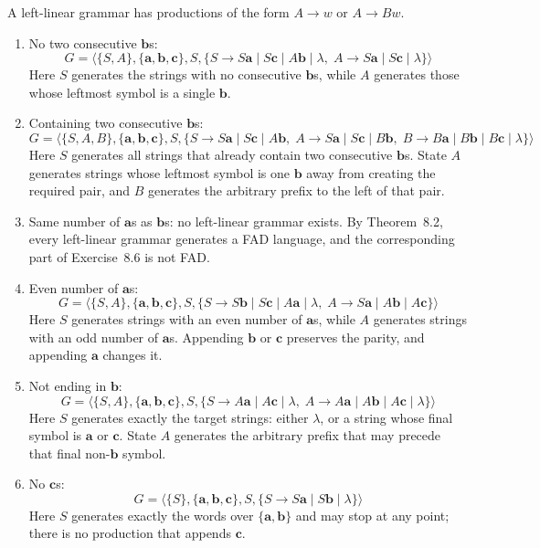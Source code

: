 \begin{enumerate}[{8.}1. ]
A left-linear grammar has productions of the form $A \to w$ or $A \to Bw$.

\begin{enumerate}
\item No two consecutive $\pmb{b}$s:
\[
G = \langle\{S,A\},\{\pmb{a},\pmb{b},\pmb{c}\},S,
\{S\to S\pmb{a}\mid S\pmb{c}\mid A\pmb{b}\mid \lambda,\;
  A\to S\pmb{a}\mid S\pmb{c}\mid \lambda\}\rangle
\]
Here $S$ generates the strings with no consecutive $\pmb{b}$s, while $A$
generates those whose leftmost symbol is a single $\pmb{b}$.

\item Containing two consecutive $\pmb{b}$s:
\[
G = \langle\{S,A,B\},\{\pmb{a},\pmb{b},\pmb{c}\},S,
\{S\to S\pmb{a}\mid S\pmb{c}\mid A\pmb{b},\;
  A\to S\pmb{a}\mid S\pmb{c}\mid B\pmb{b},\;
  B\to B\pmb{a}\mid B\pmb{b}\mid B\pmb{c}\mid \lambda\}\rangle
\]
Here $S$ generates all strings that already contain two consecutive $\pmb{b}$s.
State $A$ generates strings whose leftmost symbol is one $\pmb{b}$ away from
creating the required pair, and $B$ generates the arbitrary prefix to the left of
that pair.

\item Same number of $\pmb{a}$s as $\pmb{b}$s: no left-linear grammar exists.
By Theorem~8.2, every left-linear grammar generates a FAD language, and the
corresponding part of Exercise~8.6 is not FAD.

\item Even number of $\pmb{a}$s:
\[
G = \langle\{S,A\},\{\pmb{a},\pmb{b},\pmb{c}\},S,
\{S\to S\pmb{b}\mid S\pmb{c}\mid A\pmb{a}\mid \lambda,\;
  A\to S\pmb{a}\mid A\pmb{b}\mid A\pmb{c}\}\rangle
\]
Here $S$ generates strings with an even number of $\pmb{a}$s, while $A$
generates strings with an odd number of $\pmb{a}$s.  Appending $\pmb{b}$ or
$\pmb{c}$ preserves the parity, and appending $\pmb{a}$ changes it.

\item Not ending in $\pmb{b}$:
\[
G = \langle\{S,A\},\{\pmb{a},\pmb{b},\pmb{c}\},S,
\{S\to A\pmb{a}\mid A\pmb{c}\mid \lambda,\;
  A\to A\pmb{a}\mid A\pmb{b}\mid A\pmb{c}\mid \lambda\}\rangle
\]
Here $S$ generates exactly the target strings: either $\lambda$, or a string
whose final symbol is $\pmb{a}$ or $\pmb{c}$.  State $A$ generates the arbitrary
prefix that may precede that final non-$\pmb{b}$ symbol.

\item No $\pmb{c}$s:
\[
G = \langle\{S\},\{\pmb{a},\pmb{b},\pmb{c}\},S,
\{S\to S\pmb{a}\mid S\pmb{b}\mid \lambda\}\rangle
\]
Here $S$ generates exactly the words over $\{\pmb{a},\pmb{b}\}$ and may stop at
any point; there is no production that appends $\pmb{c}$.
\end{enumerate}


\end{enumerate}
